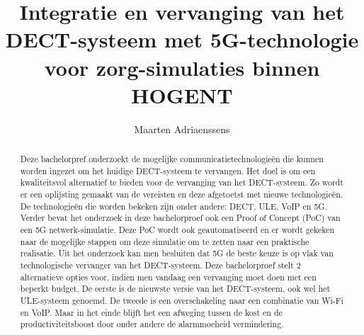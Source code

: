 \documentclass[a0,portrait]{hogent-poster}
\title{Integratie en vervanging van het DECT-\-systeem met 5G-\-technologie voor zorg-\-simulaties binnen HOGENT}
\author{Maarten Adriaenssens}
\begin{document}
\maketitle

\begin{abstract}



Deze bachelorpref onderzoekt de mogelijke communicatietechnologieën die kunnen worden ingezet om het huidige DECT-systeem te vervangen. Het doel is om een kwaliteitsvol alternatief te bieden voor de vervanging van het DECT-systeem. Zo wordt er een oplijsting gemaakt van de vereisten en deze afgetoetst met nieuwe technologieën. De technologieën die worden bekeken zijn onder andere: DECT, ULE, VoIP en 5G. Verder bevat het onderzoek in deze bachelorproef ook een Proof of Concept (PoC) van een 5G netwerk-simulatie. Deze PoC wordt ook geautomatiseerd en er wordt gekeken naar de mogelijke stappen om deze simulatie om te zetten naar een praktische realisatie. Uit het onderzoek kan men besluiten dat 5G de beste keuze is op vlak van technologische vervanger van het DECT-systeem. Deze bachelorproef stelt 2 alternatieve opties voor, indien men vandaag een vervanging moet doen met een beperkt budget. De eerste is de nieuwste versie van het DECT-systeem, ook wel het ULE-systeem genoemd. De tweede is een overschakeling naar een combinatie van Wi-Fi en VoIP. Maar in het einde blijft het een afweging tussen de kost en de productiviteitsboost door onder andere de alarmmoeheid vermindering.


\end{abstract}
\end{document}
